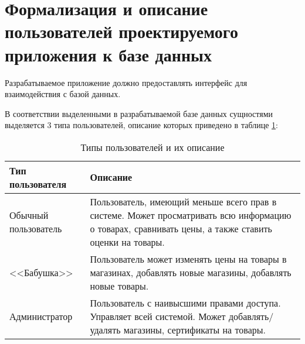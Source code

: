 \section{Формализация и описание пользователей проектируемого приложения к базе данных}

Разрабатываемое приложение должно предоставлять интерфейс для взаимодействия с базой данных. 

В соответствии выделенными в разрабатываемой базе данных сущностями выделяется 3 типа пользователей, описание которых приведено в таблице \ref{tbl:db_roles}:


\begin{table}[ht]
	\begin{center}
		\begin{threeparttable}
			\caption{Типы пользователей и их описание}
			\label{tbl:db_roles}
			\begin{tabular}{|p{4.5cm}|p{10cm}|}
				\hline
				\textbf{Тип пользователя} & \textbf{Описание} \\ \hline
				Обычный пользователь & Пользователь, имеющий меньше всего прав в системе. Может просматривать всю информацию о товарах, сравнивать цены, а также ставить оценки на товары. \\
				\hline
				<<Бабушка>> & Пользователь может изменять цены на товары в магазинах, добавлять новые магазины, добавлять новые товары. \\ 
				\hline
				Администратор & Пользователь с наивысшими правами доступа. Управляет всей системой. Может добавлять/удалять магазины, сертификаты на товары. \\ 
				\hline
			\end{tabular}
		\end{threeparttable}
	\end{center}
\end{table}
%
%
%
